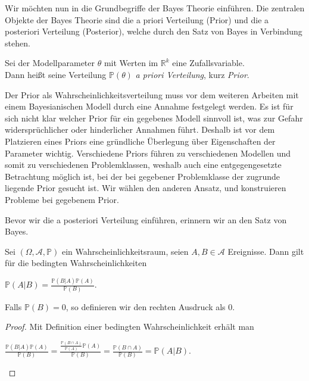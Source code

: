 Wir möchten nun in die Grundbegriffe der Bayes Theorie einführen. 
Die zentralen Objekte der Bayes Theorie sind die a priori Verteilung (Prior) und die a posteriori Verteilung (Posterior), welche durch den Satz von Bayes in Verbindung stehen. 

\begin{defi}
	Sei der Modellparameter $\theta$ mit Werten im $\mathbb{R}^k$ eine Zufallsvariable. 		\\
	Dann heißt seine Verteilung $\mathbb{P}(\theta)$ \textit{a priori Verteilung}, kurz 		\textit{Prior}. 
\end{defi}

Der Prior als Wahrscheinlichkeitsverteilung muss vor dem weiteren Arbeiten mit einem Bayesianischen Modell durch eine Annahme festgelegt werden. Es ist für sich nicht klar welcher Prior für ein gegebenes Modell sinnvoll ist, was zur Gefahr widersprüchlicher oder hinderlicher Annahmen führt. Deshalb ist vor dem Platzieren eines Priors eine gründliche Überlegung über Eigenschaften der Parameter wichtig. Verschiedene Priors führen zu verschiedenen Modellen und somit zu verschiedenen Problemklassen, weshalb auch eine entgegengesetzte Betrachtung möglich ist, bei der bei gegebener Problemklasse der zugrunde liegende Prior gesucht ist. Wir wählen den anderen Ansatz, und konstruieren Probleme bei gegebenem Prior.

Bevor wir die a posteriori Verteilung einführen, erinnern wir an den Satz von Bayes.

\begin{theorem}
	Sei $(\Omega, \mathcal{A}, \mathbb{P})$ ein Wahrscheinlichkeitsraum, seien 
	$A,B \in \mathcal{A}$ Ereignisse. Dann gilt für die bedingten Wahrscheinlichkeiten
	\begin{center}
		$\mathbb{P}(A\vert B) = \frac{\mathbb{P}(B \vert A) \mathbb{P}(A)}{\mathbb{P}				(B)}$.
	\end{center}
	Falls $\mathbb{P}(B) = 0$, so definieren wir den rechten Ausdruck als $0$.
\end{theorem}

\begin{proof}
	Mit Definition einer bedingten Wahrscheinlichkeit erhält man
	\begin{center}
		$\frac{\mathbb{P}(B \vert A) \mathbb{P}(A)}{\mathbb{P}(B)}
		= \frac{\frac{\mathbb{P}(B \cap A)}{\mathbb{P}(A)} \mathbb{P}(A)}{\mathbb{P}(B)}
		= \frac{\mathbb{P}(B \cap A)}{\mathbb{P}(B)}
		= \mathbb{P}(A\vert B)$.
	\end{center}
\end{proof}

